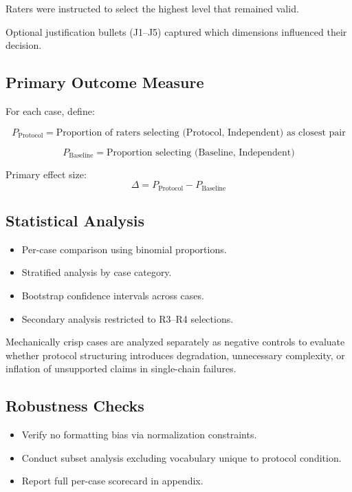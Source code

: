 Raters were instructed to select the highest level that remained valid.

Optional justification bullets (J1--J5) captured which dimensions influenced their decision.

\subsection{Primary Outcome Measure}

For each case, define:

\[
P_{\text{Protocol}} = \text{Proportion of raters selecting (Protocol, Independent) as closest pair}
\]

\[
P_{\text{Baseline}} = \text{Proportion selecting (Baseline, Independent)}
\]

Primary effect size:
\[
\Delta = P_{\text{Protocol}} - P_{\text{Baseline}}
\]

\subsection{Statistical Analysis}

\begin{itemize}
    \item Per-case comparison using binomial proportions.
    \item Stratified analysis by case category.
    \item Bootstrap confidence intervals across cases.
    \item Secondary analysis restricted to R3--R4 selections.
\end{itemize}

Mechanically crisp cases are analyzed separately as negative controls to evaluate whether protocol structuring introduces degradation, unnecessary complexity, or inflation of unsupported claims in single-chain failures.

\subsection{Robustness Checks}

\begin{itemize}
    \item Verify no formatting bias via normalization constraints.
    \item Conduct subset analysis excluding vocabulary unique to protocol condition.
    \item Report full per-case scorecard in appendix.
\end{itemize}

